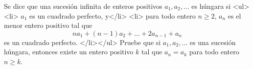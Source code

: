 Se dice que una sucesión infinita de enteros positivos $a_1, a_2, \dots$ es húngara si
<ul>
<li> $a_1$ es un cuadrado perfecto, y</li>
<li> para todo entero $n\ge 2$, $a_n$ es el menor entero positivo tal que \[na_1+(n-1)a_2+\dots+2a_{n-1}+a_n\]
es un cuadrado perfecto.
</li></ul>
Pruebe que si $a_1, a_2, \dots$ es una sucesión húngara, entonces existe un entero positivo $k$ tal que $a_n=a_k$ para todo entero $n\geq k$.